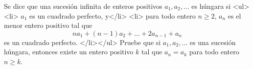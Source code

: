 Se dice que una sucesión infinita de enteros positivos $a_1, a_2, \dots$ es húngara si
<ul>
<li> $a_1$ es un cuadrado perfecto, y</li>
<li> para todo entero $n\ge 2$, $a_n$ es el menor entero positivo tal que \[na_1+(n-1)a_2+\dots+2a_{n-1}+a_n\]
es un cuadrado perfecto.
</li></ul>
Pruebe que si $a_1, a_2, \dots$ es una sucesión húngara, entonces existe un entero positivo $k$ tal que $a_n=a_k$ para todo entero $n\geq k$.